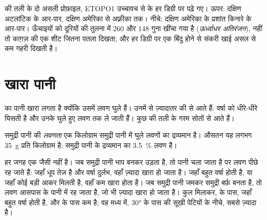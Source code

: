 \begin{omfigure}
{\small {} की तली के दो असली प्रोफ़ाइल, ETOPO1 उच्चावच से  के हर डिग्री पर
पढ़े गए। ऊपर: दक्षिण अटलांटिक के आर-पार, दक्षिण अमेरिका से अफ़्रीका तक। नीचे: दक्षिण
अमेरिका के प्रशांत किनारे के आर-पार। ऊँचाइयों को दूरियों की तुलना में 260 और 148 गुना
खींचा गया है (\emph{ऊर्ध्वाधर अतिरंजन}), नहीं तो  काग़ज़ की एक शीट जितना पतला
दिखता; और हर डिग्री पर एक बिंदु होने से संकरी खाई असल से कम गहरी
दिखती है।}
\label{fig:g8:the-oceans:profiles}
\end{omfigure}


\section{खारा पानी}

 का पानी खारा लगता है क्योंकि उसमें लवण घुले हैं। उनमें से ज़्यादातर  की
 से आते हैं: वर्षा  को धीरे-धीरे घिसती है और  उनके घुले हुए लवण
 तक ले जाती हैं। कुछ  की तली के गरम सोतों से आते
हैं।

\begin{definition}[लवणता]\label{def:g8:the-oceans:salinity}
समुद्री पानी की \emph{लवणता} एक किलोग्राम समुद्री पानी में घुले लवणों
का द्रव्यमान है। औसतन यह लगभग \qty{35}{g} प्रति किलोग्राम है: समुद्री पानी के
द्रव्यमान का \qty{3.5}{\%}
लवण है।
\end{definition}

 हर जगह एक जैसी नहीं है। जब समुद्री पानी भाप बनकर उड़ता है, तो पानी चला जाता है
पर लवण पीछे रह जाते हैं: जहाँ धूप तेज़ है और वर्षा दुर्लभ, वहाँ  ज़्यादा खारा हो
जाता है। जहाँ बहुत वर्षा होती है, या जहाँ कोई बड़ी  आकर मिलती है, वहाँ  कम खारा
होता है। जब समुद्री पानी जमकर समुद्री बर्फ़ बनता है, तो लवण आसपास के पानी में रह जाता है,
जो भी ज़्यादा खारा हो जाता है। कुल मिलाकर,   के पास, जहाँ बहुत वर्षा
होती है, और  के पास कम है; वह मध्य  में, \ang{30} के पास की सूखी
पेटियों के नीचे, सबसे ज़्यादा है।

